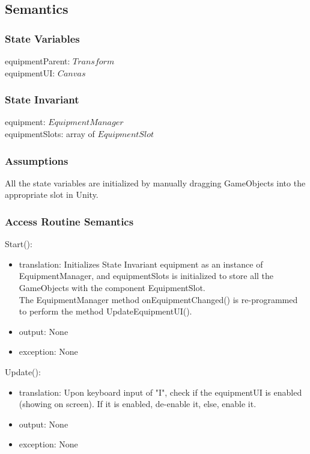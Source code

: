 \documentclass[12pt]{article}
\begin{document}
\subsection* {Semantics}

\subsubsection* {State Variables}

equipmentParent: $Transform$\\
equipmentUI: $Canvas$\\

\subsubsection* {State Invariant}

equipment: $EquipmentManager$\\
equipmentSlots: array of $EquipmentSlot$

\subsubsection* {Assumptions}

All the state variables are initialized by manually dragging GameObjects into the appropriate slot in Unity.

\subsubsection* {Access Routine Semantics}

\noindent Start():
\begin{itemize}
\item translation: Initializes State Invariant equipment as an instance of EquipmentManager, and equipmentSlots is initialized to store all the GameObjects with the component EquipmentSlot.\\
The EquipmentManager method onEquipmentChanged() is re-programmed to perform the method UpdateEquipmentUI().
\item output: None
\item exception: None
\end{itemize}

\noindent Update():
\begin{itemize}
\item translation: Upon keyboard input of "I", check if the equipmentUI is enabled (showing on screen). If it is enabled, de-enable it, else, enable it.
\item output: None
\item exception: None
\end{itemize}
\end{document}
